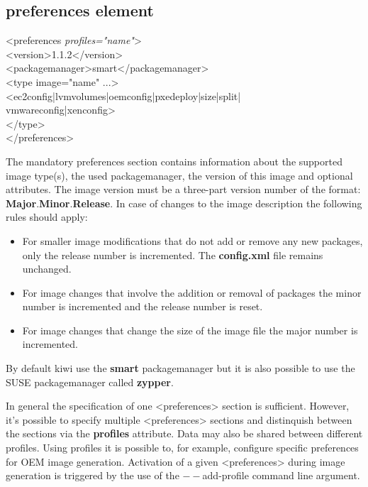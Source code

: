 \subsection{preferences element}
\begin{Command}{12cm}
<preferences \textit{profiles="name"}>\\
\hspace*{1cm}<version>1.1.2</version>\\
\hspace*{1cm}<packagemanager>smart</packagemanager>\\
\hspace*{1cm}<type image="name" ...>\\
\hspace*{2cm}<ec2config|lvmvolumes|oemconfig|pxedeploy|size|split|\\
\hspace*{2cm} vmwareconfig|xenconfig>\\
\hspace*{1cm}</type>\\
</preferences>
\end{Command}

The mandatory preferences section contains information about the supported
image type(s), the used packagemanager, the version of this image and
optional attributes. The image version must be a three-part version number of
the format: \textbf{Major}.\textbf{Minor}.\textbf{Release}. In case of
changes to the image description the following rules should apply:

\begin{itemize}
\item For smaller image modifications that do not add or remove any
      new packages, only the release number is incremented.
      The \textbf{config.xml} file remains unchanged.
\item For image changes that involve the addition or removal of packages
      the minor number is incremented and the release number is reset.
\item For image changes that change the size of the image file
      the major number is incremented.
\end{itemize}

By default kiwi use the \textbf{smart} packagemanager but it is also possible
to use the SUSE packagemanager called \textbf{zypper}. 

In general the specification of one <preferences> section is sufficient.
However, it's possible to specify multiple <preferences> sections and
distinquish between the sections via the \textbf{profiles} attribute. Data
may also be shared between different profiles. Using profiles it is possible
to, for example, configure specific preferences for OEM image generation. 
Activation of a given <preferences> during image generation is triggered by
the use of the $--$add-profile command line argument.

